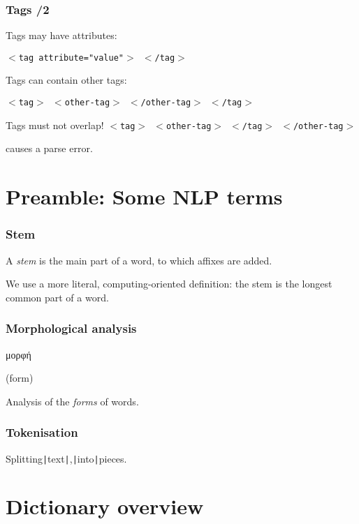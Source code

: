 \documentclass{beamer} %
\newcommand\grktext[1]{{\fontencoding{LGR}\fontfamily{pmt}\selectfont #1}}
\begin{document}
\begin{frame}
  \frametitle{Tags /2}
  Tags may have attributes: 

  {\tt $<$tag attribute="value"$>$ $<$/tag$>$}

  Tags can contain other tags: 

  {\tt $<$tag$>$ $<$other-tag$>$ $<$/other-tag$>$ $<$/tag$>$}

  \begin{alertblock}{Tags must not overlap!}
    {\tt $<$tag$>$ $<$other-tag$>$ $<$/tag$>$ $<$/other-tag$>$}

   causes a parse error. 
  \end{alertblock}
\end{frame}

\section{Preamble: Some NLP terms}

\begin{frame}
\frametitle{Stem}
A {\it stem} is the main part of a word, to which affixes are added.

\pause

We use a more literal, computing-oriented definition: the stem is the longest
common part of a word.

\end{frame}

\begin{frame}
\frametitle{Morphological analysis}

 \begin{center}
 {\Large \grktext{μορφή}}
 \end{center}

\pause
  \begin{center}
   (form)
  \end{center}

\pause

Analysis of the {\it forms} of words.

\end{frame}

\begin{frame}
\frametitle{Tokenisation}

  Splitting{\tt |}text{\tt |},{\tt |}into{\tt |}pieces.

\end{frame}

\section{Dictionary overview}
\end{document}
